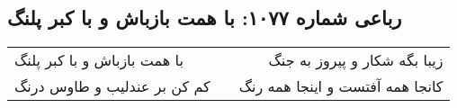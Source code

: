 \begin{center}
\section*{رباعی شماره ۱۰۷۷: با همت بازباش و با کبر پلنگ}
\label{sec:1077}
\begin{longtable}{l p{0.5cm} r}
با همت بازباش و با کبر پلنگ
&&
زیبا بگه شکار و پیروز به جنگ
\\
کم کن بر عندلیب و طاوس درنگ
&&
کانجا همه آفتست و اینجا همه رنگ
\\
\end{longtable}
\end{center}

